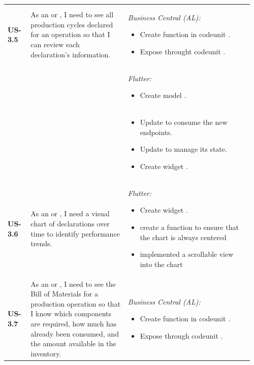 \begin{longtable}{@{} P{0.09\linewidth} P{0.38\linewidth} P{0.49\linewidth} @{}}
	\textbf{US-3.5}
	& As an  or , I need to see all
	production cycles declared for an operation so that I can review each
	declaration's information.
	& \noindent\textit{Business Central (AL):}
	\begin{itemize}[nosep, leftmargin=*]
		\item Create function  in codeunit .
		\item Expose  throught codeunit .
	\end{itemize}
\\ & &
	\noindent\textit{Flutter:}
	\begin{itemize}[nosep, leftmargin=*]
		\item Create model .
	\end{itemize} \\ & &
	\begin{itemize}[nosep, leftmargin=*]
		\item Update  to consume the new endpoints.
		\item Update  to manage its state.
		\item Create widget .
	\end{itemize} \\
\midrule
	
	\textbf{US-3.6}
	& As an  or , I need a visual chart
	of declarations over time to identify performance trends.
	& \noindent\textit{Flutter:}
	\begin{itemize}[nosep, leftmargin=*]
		\item Create widget .
		\item create a function to ensure that the chart is always centered
		\item implemented a scrollable view into the chart
	\end{itemize}\\
	\midrule
	\textbf{US-3.7}
	& As an  or , I need to see the
	Bill of Materials for a production operation so that I know which
	components are required, how much has already been consumed, and the amount 
	available in the inventory.
	& \noindent\textit{Business Central (AL):}
	\begin{itemize}[nosep, leftmargin=*]
		\item Create function  in codeunit .
		\item Expose  through codeunit .
		

\end{itemize}
\end{longtable}
